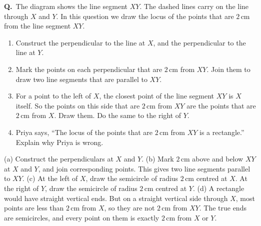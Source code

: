 \documentclass[12pt,a4paper]{article}
\newcounter{sol}
\newcommand{\s}{\refstepcounter{sol}\textbf{Q\thesol.}\ }
\newcommand{\pt}[3]{\fill #1 circle (1.5pt); \node[inner sep=2pt,#2] at #1 {$#3$};}
\begin{document}
\s The diagram shows the line segment \(XY\). The dashed lines carry on the line through \(X\) and \(Y\). In this question we draw the locus of the points that are \(2\)\,cm from the line segment \(XY\).
\begin{enumerate}
  \item Construct the perpendicular to the line at \(X\), and the perpendicular to the line at \(Y\).
  \item Mark the points on each perpendicular that are \(2\)\,cm from \(XY\). Join them to draw two line segments that are parallel to \(XY\).
  \item For a point to the left of \(X\), the closest point of the line segment \(XY\) is \(X\) itself. So the points on this side that are \(2\)\,cm from \(XY\) are the points that are \(2\)\,cm from \(X\). Draw them. Do the same to the right of \(Y\).
  \item Priya says, ``The locus of the points that are \(2\)\,cm from \(XY\) is a rectangle.'' Explain why Priya is wrong.
\end{enumerate}

\begin{solbox}
(a) Construct the perpendiculars at \(X\) and \(Y\). (b) Mark \(2\)\,cm above and below \(XY\) at \(X\) and \(Y\), and join corresponding points. This gives two line segments parallel to \(XY\). (c) At the left of \(X\), draw the semicircle of radius \(2\)\,cm centred at \(X\). At the right of \(Y\), draw the semicircle of radius \(2\)\,cm centred at \(Y\). (d) A rectangle would have straight vertical ends. But on a straight vertical side through \(X\), most points are less than \(2\)\,cm from \(X\), so they are not \(2\)\,cm from \(XY\). The true ends are semicircles, and every point on them is exactly \(2\)\,cm from \(X\) or \(Y\).
\end{solbox}

\begin{center}
\end{center}

\newpage
\end{document}
